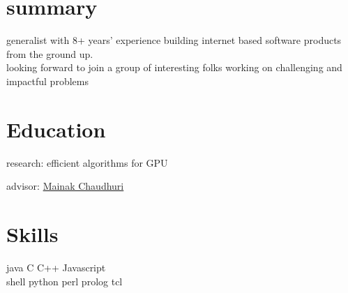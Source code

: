
\begin{minipage}[t]{0.30\textwidth} %

\section{summary}
\location{}
generalist with 8+ years' experience building internet based software products from the ground up.\\
looking forward to join a group of interesting folks working on challenging and impactful problems
\sectionspace %

\section{Education} 
\vspace{\topsep} %
\vspace{1pt}
\begin{tightitemize}
\item research: efficient algorithms for GPU
\item advisor: \href{https://www.cse.iitk.ac.in/users/mainakc/}{Mainak Chaudhuri} 
\end{tightitemize}
\vspace{6pt}




\sectionspace %

\section{Skills}

java \textbullet{} C \textbullet{} C++ \textbullet{} Javascript\\ 
shell \textbullet{} python \textbullet{} perl \textbullet{} prolog \textbullet{} tcl\\
\sectionspace %


\end{minipage}
